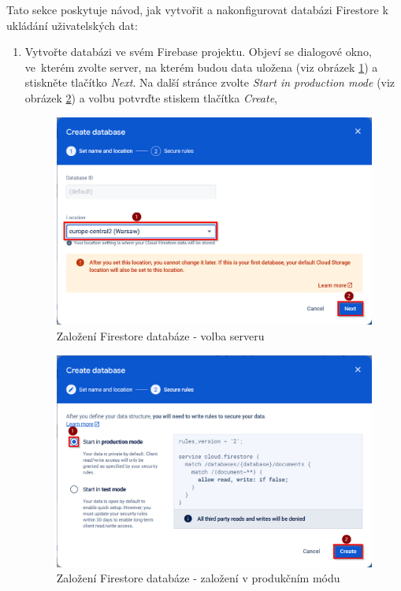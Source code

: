 \documentclass[czech, bc, kiv, he, iso690numb]{fasthesis}
\begin{document}
Tato sekce poskytuje návod, jak vytvořit a nakonfigurovat databázi Firestore k ukládání uživatelských dat:

\begin{enumerate}[label=\arabic*.]
\item Vytvořte databázi ve svém Firebase projektu. Objeví se dialogové okno, ve~kterém zvolte server, na kterém budou data uložena (viz obrázek \ref{fig:firestore-configuration-01}) a stiskněte tlačítko \textit{Next}. Na další stránce zvolte \textit{Start in production mode} (viz obrázek \ref{fig:firestore-configuration-02}) a volbu potvrďte stiskem tlačítka \textit{Create}, 

\begin{figure}[h!]
  \centering
  \includegraphics[width=1\textwidth]{img/BP-Runt/firebase-configuration/firestore/create-firestore-database.png}
  \caption{Založení Firestore databáze - volba serveru}
  \label{fig:firestore-configuration-01}
\end{figure}

\begin{figure}[h!]
  \centering
  \includegraphics[width=1\textwidth]{img/BP-Runt/firebase-configuration/firestore/create-firestore-database-2.png}
  \caption{Založení Firestore databáze - založení v produkčním módu}
  \label{fig:firestore-configuration-02}
\end{figure}


\end{enumerate}
\end{document}
